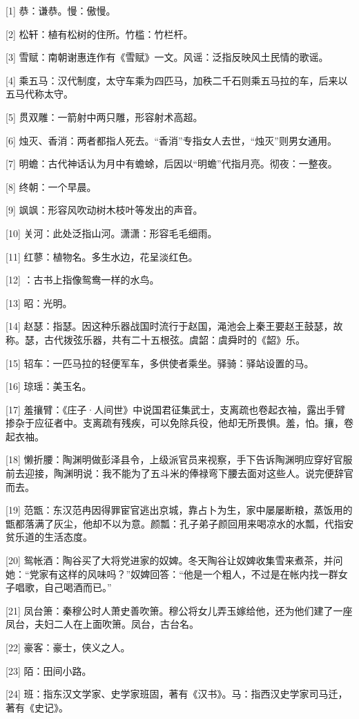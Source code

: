 \documentclass[12pt,UTF8]{ctexbook}
\begin{document}
[1] 恭：谦恭。慢：傲慢。

[2] 松轩：植有松树的住所。竹槛：竹栏杆。

[3] 雪赋：南朝谢惠连作有《雪赋》一文。风谣：泛指反映风土民情的歌谣。

[4] 乘五马：汉代制度，太守车乘为四匹马，加秩二千石则乘五马拉的车，后来以五马代称太守。

[5] 贯双雕：一箭射中两只雕，形容射术高超。

[6] 烛灭、香消：两者都指人死去。“香消”专指女人去世，“烛灭”则男女通用。

[7] 明蟾：古代神话认为月中有蟾蜍，后因以“明蟾”代指月亮。彻夜：一整夜。

[8] 终朝：一个早晨。

[9] 飒飒：形容风吹动树木枝叶等发出的声音。

[10] 关河：此处泛指山河。潇潇：形容毛毛细雨。

[11] 红蓼：植物名。多生水边，花呈淡红色。

[12] ：古书上指像鸳鸯一样的水鸟。

[13] 昭：光明。

[14] 赵瑟：指瑟。因这种乐器战国时流行于赵国，渑池会上秦王要赵王鼓瑟，故称。瑟，古代拨弦乐器，共有二十五根弦。虞韶：虞舜时的《韶》乐。

[15] 轺车：一匹马拉的轻便军车，多供使者乘坐。驿骑：驿站设置的马。

[16] 琼瑶：美玉名。

[17] 羞攘臂：《庄子·人间世》中说国君征集武士，支离疏也卷起衣袖，露出手臂掺杂于应征者中。支离疏有残疾，可以免除兵役，他却无所畏惧。羞，怕。攘，卷起衣袖。

[18] 懒折腰：陶渊明做彭泽县令，上级派官员来视察，手下告诉陶渊明应穿好官服前去迎接，陶渊明说：我不能为了五斗米的俸禄弯下腰去面对这些人。说完便辞官而去。

[19] 范甑：东汉范冉因得罪宦官逃出京城，靠占卜为生，家中屡屡断粮，蒸饭用的甑都落满了灰尘，他却不以为意。颜瓢：孔子弟子颜回用来喝凉水的水瓢，代指安贫乐道的生活态度。

[20] 鸳帐酒：陶谷买了大将党进家的奴婢。冬天陶谷让奴婢收集雪来煮茶，并问她：“党家有这样的风味吗？”奴婢回答：“他是一个粗人，不过是在帐内找一群女子唱歌，自己喝酒而已。”

[21] 凤台箫：秦穆公时人萧史善吹箫。穆公将女儿弄玉嫁给他，还为他们建了一座凤台，夫妇二人在上面吹箫。凤台，古台名。

[22] 豪客：豪士，侠义之人。

[23] 陌：田间小路。

[24] 班：指东汉文学家、史学家班固，著有《汉书》。马：指西汉史学家司马迁，著有《史记》。
\end{document}
